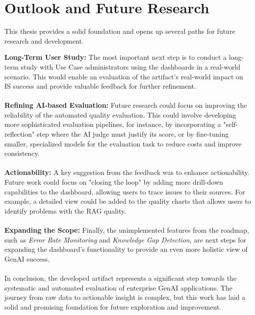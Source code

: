 \documentclass[
	english,
	ruledheaders=section,%
	class=report,%
	thesis={type=bachelor},%
	accentcolor=1b,%
	custommargins=true,%
	marginpar=false,%
	parskip=half-,%
	fontsize=11pt,%
	DIV=14,
]{tudapub}
\begin{document}
\section{Outlook and Future Research}
This thesis provides a solid foundation and opens up several paths for future research and development.

\textbf{Long-Term User Study:} The most important next step is to conduct a long-term study with Use Case administrators using the dashboards in a real-world scenario. This would enable an evaluation of the artifact's real-world impact on IS success and provide valuable feedback for further refinement.\\
\\
\textbf{Refining AI-based Evaluation:} Future research could focus on improving the reliability of the automated quality evaluation. This could involve developing more sophisticated evaluation pipelines, for instance, by incorporating a "self-reflection" step where the AI judge must justify its score, or by fine-tuning smaller, specialized models for the evaluation task to reduce costs and improve consistency.\\
\\
\textbf{Actionability:} A key suggestion from the feedback was to enhance actionability. Future work could focus on "closing the loop" by adding more drill-down capabilities to the dashboard, allowing users to trace issues to their sources. For example, a detailed view could be added to the quality charts that allows users to identify problems with the RAG quality.\\
\\
\textbf{Expanding the Scope:} Finally, the unimplemented features from the roadmap, such as \textit{Error Rate Monitoring} and \textit{Knowledge Gap Detection}, are next steps for expanding the dashboard's functionality to provide an even more holistic view of GenAI success.\\
\\
In conclusion, the developed artifact represents a significant step towards the systematic and automated evaluation of enterprise GenAI applications. The journey from raw data to actionable insight is complex, but this work has laid a solid and promising foundation for future exploration and improvement.

\end{document}
